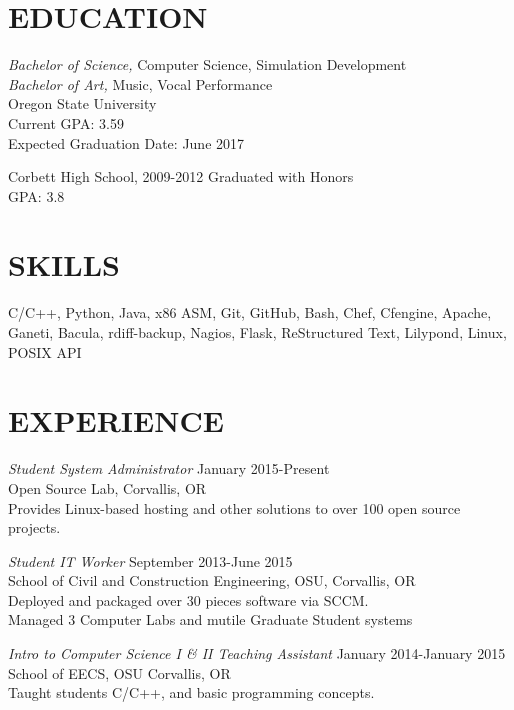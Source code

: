 \documentclass[line,margin]{res}
\begin{document}
\address{(503)-758-6952, fahlmantaylor@gmail.com, tfahl.com}
\address{github.com/fahlmant, linkedin.com/in/taylorfahlman}
\begin{resume}


\section{EDUCATION}
                    {\sl Bachelor of Science,} Computer Science, Simulation Development \\
                    {\sl Bachelor of Art,} Music, Vocal Performance \\
                    Oregon State University\\
                    Current GPA: 3.59\\
                    Expected Graduation Date: June 2017 
                    
                    Corbett High School, 2009-2012
                    Graduated with Honors\\
                    GPA: 3.8
\section{SKILLS}
                    C/C++, Python, Java, x86 ASM, Git, GitHub, Bash, Chef, Cfengine, Apache, Ganeti, Bacula, rdiff-backup,
                    Nagios, Flask, ReStructured Text, Lilypond, Linux, POSIX API
\section{EXPERIENCE}
                    {\sl Student System Administrator} \hfill January 2015-Present \\
                    Open Source Lab, 
                    Corvallis, OR\\
                    Provides Linux-based hosting and other solutions to over 100 open source projects.

                    {\sl Student IT Worker} \hfill September 2013-June 2015 \\
                    School of Civil and Construction Engineering, OSU, 
                    Corvallis, OR\\ 
                    Deployed and packaged over 30 pieces software via SCCM.\\
                    Managed 3 Computer Labs and mutile Graduate Student systems

                    {\sl Intro to Computer Science I \& II Teaching Assistant} \hfill January 2014-January 2015\\
                    School of EECS, OSU
                    Corvallis, OR\\
                    Taught students C/C++, and basic programming concepts.
                    

\end{resume}
\end{document}
